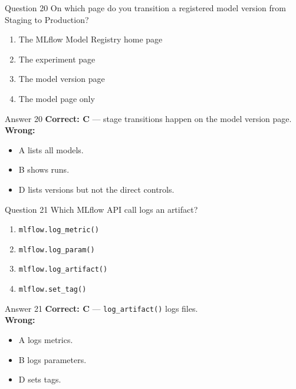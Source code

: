 \documentclass[aspectratio=169,11pt]{beamer}
\begin{document}
	\begin{frame}{Question 20}
		On which page do you transition a registered model version from Staging to Production?
		\begin{enumerate}[label=\Alph*.]
			\item The MLflow Model Registry home page
			\item The experiment page
			\item The model version page
			\item The model page only
		\end{enumerate}
	\end{frame}
	\begin{frame}{Answer 20}
		\textbf{Correct: C} --- stage transitions happen on the model version page.\\
		\vspace{0.5em}
		\textbf{Wrong:}
		\begin{itemize}
			\item A lists all models.
			\item B shows runs.
			\item D lists versions but not the direct controls.
		\end{itemize}
	\end{frame}
	
	\begin{frame}{Question 21}
		Which MLflow API call logs an artifact?
		\begin{enumerate}[label=\Alph*.]
			\item \texttt{mlflow.log\_metric()}
			\item \texttt{mlflow.log\_param()}
			\item \texttt{mlflow.log\_artifact()}
			\item \texttt{mlflow.set\_tag()}
		\end{enumerate}
	\end{frame}
	\begin{frame}{Answer 21}
		\textbf{Correct: C} --- \texttt{log\_artifact()} logs files.\\
		\vspace{0.5em}
		\textbf{Wrong:}
		\begin{itemize}
			\item A logs metrics.
			\item B logs parameters.
			\item D sets tags.
		\end{itemize}
	\end{frame}
	
\end{document}
